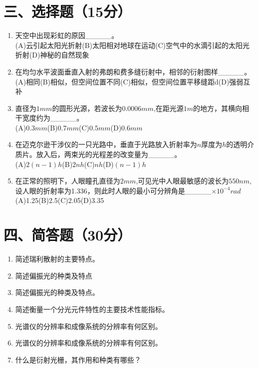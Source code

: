 \documentclass[12pt, a4paper]{article}
\theoremstyle{solution}
\begin{document}
\section*{三、选择题（15分）}
\begin{enumerate}
    \item 天空中出现彩虹的原因\_\_\_\_\_。\\(A)云引起太阳光折射\quad(B)太阳相对地球在运动\quad(C)空气中的水滴引起的太阳光折射\quad(D)神秘的自然现象
    \item 在均匀水平波面垂直入射的弗朗和费多缝衍射中，相邻的衍射图样\_\_\_\_\_。\\(A)相同\quad(B)相似，但空间位置不同\quad(C)相似，但空间位置平移缝距d\quad(D)强弱互补
    \item 直径为$1mm$的圆形光源，若波长为$0.0006mm$,在距光源$1m$的地方，其横向相干宽度约为\_\_\_\_\_。\\(A)$0.3mm$\quad(B)$0.7mm$\quad(C)$0.5mm$\quad(D)$0.6mm$
    \item 在迈克尔逊干涉仪的一只光路中，垂直于光路放入折射率为$n$厚度为$h$的透明介质片。放入后，两束光的光程差的改变量为\_\_\_\_\_。\\(A)$2(n-1)h$\quad(B)$2nh$\quad(C)$nh$(D)$(n-1)h$
    \item 在正常的照明下，人眼瞳孔直径为$2mm$,可见光中人眼最敏感的波长为$550nm$,设人眼的折射率为1.336，则此时人眼的最小可分辨角是\_\_\_\_\_$\times10^{-4}rad$\\(A)1.25\quad(B)2.5\quad(C)2.05\quad(D)3.35
\end{enumerate}
\section*{四、简答题（30分）}
\begin{enumerate}
    \item 简述瑞利散射的主要特点。
    \item 简述偏振光的种类及特点
    \item 简述偏振光的种类及特点。
    \item 简述衡量一个分光元件特性的主要技术性能指标。
    \item 光谱仪的分辨率和成像系统的分辨率有何区别。
    \item 光谱仪的分辨率和成像系统的分辨率有何区别。
    \item 什么是衍射光栅，其作用和种类有哪些？
\end{enumerate}
\end{document}
